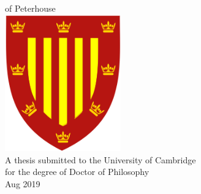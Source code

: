 \begin{center}%
	\begin{doublespace}%
		{\Huge\textbf{\thetitle}}\\%
	\end{doublespace}%
	\vspace*{3cm}%
	{\Large{\theauthor} \\ of Peterhouse }\\%
	\vspace*{3cm}%
	\includegraphics[width=5cm]{Peterhouse.png} \\
	\vspace*{2cm}
	{A thesis submitted to the University of Cambridge\\ for the degree of Doctor of Philosophy \\ Aug 2019}
\end{center}%
